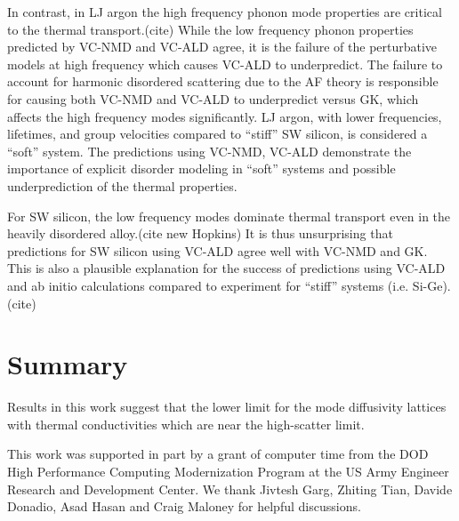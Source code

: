 \documentclass[aps,prb,onecolumn,preprint,superscriptaddress,amsmath,amssymb,floatfix]{revtex4}
\begin{document}
In contrast, 
in LJ argon the high frequency phonon mode properties are critical 
to the thermal transport.(cite)  
While the low frequency phonon properties predicted by VC-NMD and 
VC-ALD agree, it is the failure of the perturbative models at 
high frequency which causes VC-ALD to underpredict. The failure 
to account for harmonic disordered scattering due to the AF theory 
is responsible for causing both VC-NMD and VC-ALD to underpredict 
versus GK, which affects the high frequency modes significantly. 
LJ argon, with lower 
frequencies, lifetimes, and group velocities compared to 
``stiff'' SW silicon, 
is considered a ``soft'' system. The predictions using 
VC-NMD, VC-ALD demonstrate the importance of explicit disorder 
modeling in ``soft'' systems and possible underprediction 
of the thermal properties.\cite{tian_phonon_2012}

For SW silicon, the low frequency modes dominate thermal transport 
even in the heavily disordered alloy.(cite new Hopkins) 
It is thus unsurprising that predictions for 
SW silicon using VC-ALD agree well with VC-NMD and GK. This is also a 
plausible explanation for the success of predictions using 
VC-ALD and ab initio calculations compared to experiment for 
``stiff'' systems (i.e. Si-Ge).(cite)

\section{\label{S:}Summary}

Results in this work suggest that the lower limit for the mode diffusivity 
lattices with thermal conductivities which are near the 
high-scatter limit.

\begin{acknowledgements}
This work was supported in part by a grant of computer time from the DOD 
High Performance Computing Modernization Program at the US Army Engineer 
Research and Development Center. 
We thank Jivtesh Garg, Zhiting Tian, Davide Donadio, 
Asad Hasan and Craig Maloney for helpful discussions.
\end{acknowledgements}

\appendix

\end{document}
